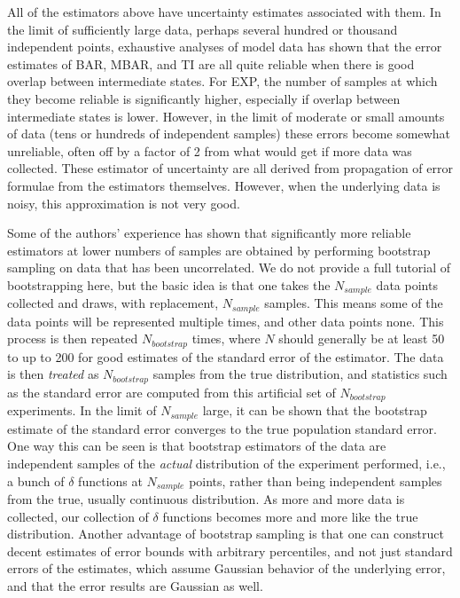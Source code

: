 \documentclass[9pt,bestpractices]{livecoms}
\begin{document}
All of the estimators above have uncertainty estimates associated with them.  In the limit of sufficiently large data, perhaps several hundred or thousand independent points, exhaustive analyses of model data has shown that the error estimates of BAR, MBAR, and TI are all quite reliable when there is good overlap between intermediate states. For EXP, the number of samples at which they become reliable is significantly higher, especially if overlap between intermediate states is lower. However, in the limit of moderate or small amounts of data (tens or hundreds of independent samples) these errors become somewhat unreliable, often off by a factor of 2 from what would get if more data was collected. These estimator of uncertainty are all derived from propagation of error formulae from the estimators themselves. However, when the underlying data is noisy, this approximation is not very good.

Some of the authors' experience has shown that significantly more reliable estimators at lower numbers of samples are obtained by performing bootstrap sampling on data that has been uncorrelated. We do not provide a full tutorial of bootstrapping here, but the basic idea is that one takes the $N_{sample}$ data points collected and draws, with replacement, $N_{sample}$ samples.  This means some of the data points will be represented multiple times, and other data points none. This process is then repeated $N_{bootstrap}$ times, where $N$ should generally be at least 50 to up to 200 for good estimates of the standard error of the estimator.  The data is then \textit{treated} as $N_{bootstrap}$ samples from the true distribution, and statistics such as the standard error are computed from this artificial set of $N_{bootstrap}$ experiments.  In the limit of $N_{sample}$ large, it can be shown that the bootstrap estimate of the standard error converges to the true population standard error.  One way this can be seen is that bootstrap estimators of the data are independent samples of the \textit{actual} distribution of the experiment performed, i.e., a bunch of $\delta$ functions at $N_{sample}$ points, rather than being independent samples from the true, usually continuous distribution.  As more and more data is collected, our collection of $\delta$ functions becomes more and more like the true distribution. Another advantage of bootstrap sampling is that one can construct decent estimates of error bounds with arbitrary percentiles, and not just standard errors of the estimates, which assume Gaussian behavior of the underlying error, and that the error results are Gaussian as well.  
\end{document}
